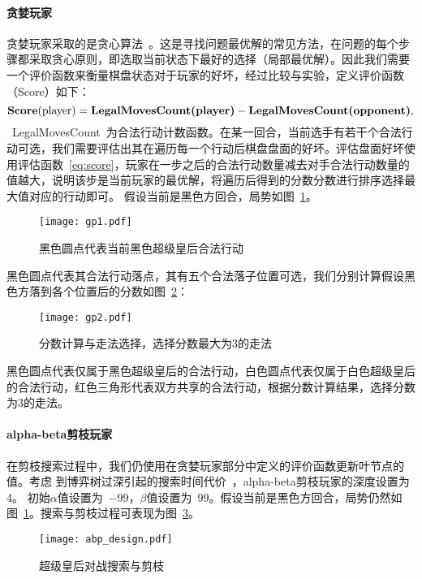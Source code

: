 \paragraph{贪婪玩家}
贪婪玩家采取的是贪心算法~\cite{introAlgo}。这是寻找问题最优解的常见方法，在问题的每个步骤都采取贪心原则，即选取当前状态下最好的选择（局部最优解）。因此我们需要一个评价函数来衡量棋盘状态对于玩家的好坏，经过比较与实验，定义评价函数（Score）如下：
\begin{equation}
    \textbf{Score}(\text{player}) = \textbf{LegalMovesCount(\text{player})} - \textbf{LegalMovesCount(\text{opponent})},
    \label{eq:score}
\end{equation}
~LegalMovesCount~为合法行动计数函数。在某一回合，当前选手有若干个合法行动可选，我们需要评估出其在遍历每一个行动后棋盘盘面的好坏。评估盘面好坏使用评估函数~\eqref{eq:score}，玩家在一步之后的合法行动数量减去对手合法行动数量的值越大，说明该步是当前玩家的最优解，将遍历后得到的分数分数进行排序选择最大值对应的行动即可。
假设当前是黑色方回合，局势如图~\ref{fig:gp1}。
\begin{figure}[htb]
    \centering
    \texttt{[image: gp1.pdf]}
    \caption[gp1]{%
        黑色圆点代表当前黑色超级皇后合法行动%
      }
    \label{fig:gp1}
\end{figure}
黑色圆点代表其合法行动落点，其有五个合法落子位置可选，我们分别计算假设黑色方落到各个位置后的分数如图~\ref{fig:gp2}：
\begin{figure}[htb]
    \centering
    \texttt{[image: gp2.pdf]}
    \caption[gp2]{%
        分数计算与走法选择，选择分数最大为3的走法%
      }
    \label{fig:gp2}
\end{figure}
黑色圆点代表仅属于黑色超级皇后的合法行动，白色圆点代表仅属于白色超级皇后的合法行动，红色三角形代表双方共享的合法行动，根据分数计算结果，选择分数为3的走法。
\paragraph{alpha-beta剪枝玩家}
在剪枝搜索过程中，我们仍使用在贪婪玩家部分中定义的评价函数更新叶节点的值。考虑
到博弈树过深引起的搜索时间代价~\cite{sstextbook}，alpha-beta剪枝玩家的深度设置为4。
初始$\alpha$值设置为~$-99$，$\beta$值设置为~$99$。假设当前是黑色方回合，局势仍然如图~\ref{fig:gp1}。搜索与剪枝过程可表现为图~\ref{fig:abpde}。
\begin{figure}[htb]
    \centering
    \texttt{[image: abp\_design.pdf]}
    \caption[abpde]{%
        超级皇后对战搜索与剪枝%
      }
    \label{fig:abpde}
\end{figure}

